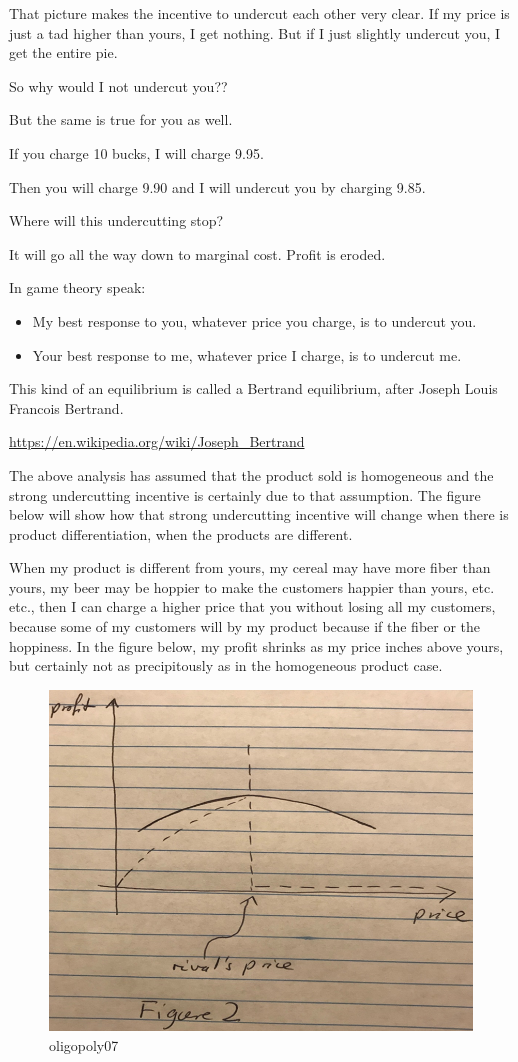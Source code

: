 \documentclass[
]{book}
\providecommand{\tightlist}{%
  \setlength{\itemsep}{0pt}\setlength{\parskip}{0pt}}
\begin{document}
That picture makes the incentive to undercut each other very clear. If my price is just a tad higher than yours, I get nothing. But if I just slightly undercut you, I get the entire pie.

So why would I not undercut you??

But the same is true for you as well.

If you charge 10 bucks, I will charge 9.95.

Then you will charge 9.90 and I will undercut you by charging 9.85.

Where will this undercutting stop?

It will go all the way down to marginal cost. Profit is eroded.

In game theory speak:

\begin{itemize}
\tightlist
\item
  My best response to you, whatever price you charge, is to undercut you.
\item
  Your best response to me, whatever price I charge, is to undercut me.
\end{itemize}

This kind of an equilibrium is called a Bertrand equilibrium, after Joseph Louis Francois Bertrand.

\url{https://en.wikipedia.org/wiki/Joseph_Bertrand}

The above analysis has assumed that the product sold is homogeneous and the strong undercutting incentive is certainly due to that assumption. The figure below will show how that strong undercutting incentive will change when there is product differentiation, when the products are different.

When my product is different from yours, my cereal may have more fiber than yours, my beer may be hoppier to make the customers happier than yours, etc. etc., then I can charge a higher price that you without losing all my customers, because some of my customers will by my product because if the fiber or the hoppiness. In the figure below, my profit shrinks as my price inches above yours, but certainly not as precipitously as in the homogeneous product case.

\begin{figure}

{\centering \includegraphics[width=0.5\linewidth]{img/oligopoly/fig7} 

}

\caption{oligopoly07}\label{fig:oligopoly07}
\end{figure}
\end{document}
